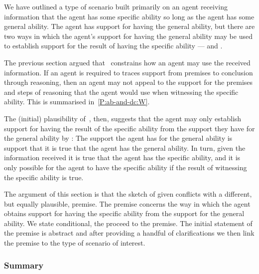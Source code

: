 \newpage

\begin{note}
  We have outlined a type of scenario built primarily on an agent receiving information that the agent has some specific ability so long as the agent has some general ability.
  The agent has support for having the general ability, but there are two ways in which the agent's support for having the general ability may be used to establish support for {\color{red} the result of having the specific ability} --- \AR{} and \WR{}.

  The previous section argued that~\uRa{} constrains how an agent may use the received information.
  If an agent is required to traces support from premises to conclusion through reasoning, then an agent may not appeal to the support for the premises and steps of reasoning that the agent would use when witnessing the specific ability.
  {\color{red} This is summarised in~\ref{P:ab-and-dc:W}.}

  The (initial) plausibility of~\uRa{}, then, suggests that the agent may only establish support for having the {\color{red} result of the specific ability} from the support they have for the general ability by \AR{}:
  The support the agent has for the general ability is support that it is true that the agent has the general ability.
  In turn, given the information received it is true that the agent has the specific ability, and it is only possible for the agent to have the specific ability if the result of witnessing the specific ability is true.

  The argument of this section is that the sketch of \AR{} given conflicts with a different, but equally plausible, premise.
  The premise concerns the way in which the agent obtains support for having the specific ability from the support for the general ability.
  We state conditional, the proceed to the premise.
  The initial statement of the premise is abstract and after providing a handful of clarifications we then link the premise to the type of scenario of interest.
\end{note}

\subsubsection{Summary}
\label{sec:ni-summary}


